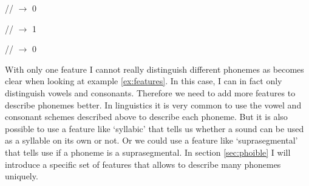 \begin{covsubexamples}[preamble={The examples show how we can describe different phonemes using features. `1' stands for: `is-a-consonant'. `0' stands for: `is-not-a-consonant' (which means that it is a vowel).}]
\label{ex:features}
\item \label{ex:features1} // $\rightarrow$ 0
\item \label{ex:features2} // $\rightarrow$ 1
\item \label{ex:features3} // $\rightarrow$ 0
\end{covsubexamples}

With only one feature I cannot really distinguish different phonemes as becomes clear when looking at example \ref{ex:features}. In this case, I can in fact only distinguish vowels and consonants. Therefore we need to add more features to describe phonemes better. In linguistics it is very common to use the vowel and consonant schemes described above to describe each phoneme. But it is also possible to use a feature like `syllabic' that tells us whether a sound can be used as a syllable on its own or not. Or we could use a feature like `suprasegmental' that tells use if a phoneme is a suprasegmental. In section \ref{sec:phoible}  I will introduce a specific set of features that allows to describe many phonemes uniquely. 
  



